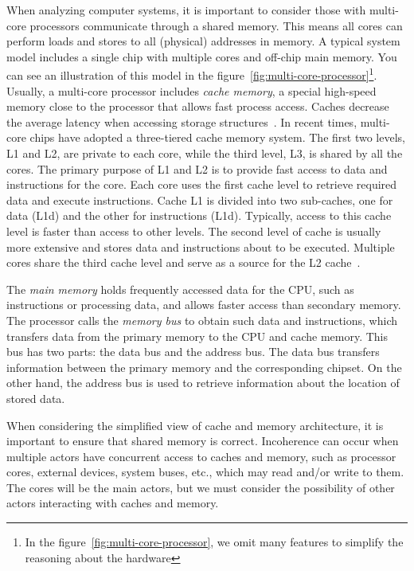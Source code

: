 When analyzing computer systems, it is important to consider those with multi-core processors communicate through a shared memory. This means all cores can perform loads and stores to all (physical) addresses in memory. A typical system model includes a single chip with multiple cores and off-chip main memory. You can see an illustration of this model in the figure~\ref{fig:multi-core-processor}\footnote{In the figure~\ref{fig:multi-core-processor}, we omit many features to simplify the reasoning about the hardware}. Usually, a multi-core processor includes \emph{cache memory}, a special high-speed memory close to the processor that allows fast process access. Caches decrease the average latency when accessing storage structures~\cite{DBLP_series_synthesis_2020Nagarajan, DBLP_series_synthesis_2013Scott}. In recent times, multi-core chips have adopted a three-tiered cache memory system. The first two levels, L1 and L2, are private to each core, while the third level, L3, is shared by all the cores. The primary purpose of L1 and L2 is to provide fast access to data and instructions for the core. Each core uses the first cache level to retrieve required data and execute instructions. Cache L1 is divided into two sub-caches, one for data (L1d) and the other for instructions (L1d). Typically, access to this cache level is faster than access to other levels. The second level of cache is usually more extensive and stores data and instructions about to be executed.
Multiple cores share the third cache level and serve as a source for the L2 cache~\cite{devices_amd64,guideintel}.


The \emph{main memory} holds frequently accessed data for the CPU, such as instructions or processing data, and allows faster access than secondary memory. The processor calls the \emph{memory bus} to obtain such data and instructions, which transfers data from the primary memory to the CPU and cache memory. This bus has two parts: the data bus and the address bus. The data bus transfers information between the primary memory and the corresponding chipset. On the other hand, the address bus is used to retrieve information about the location of stored data.


When considering the simplified view of cache and memory architecture, it is important to ensure that shared memory is correct. Incoherence can occur when multiple actors have concurrent access to caches and memory, such as processor cores, external devices, system buses, etc., which may read and/or write to them. The cores will be the main actors, but we must consider the possibility of other actors interacting with caches and memory.

